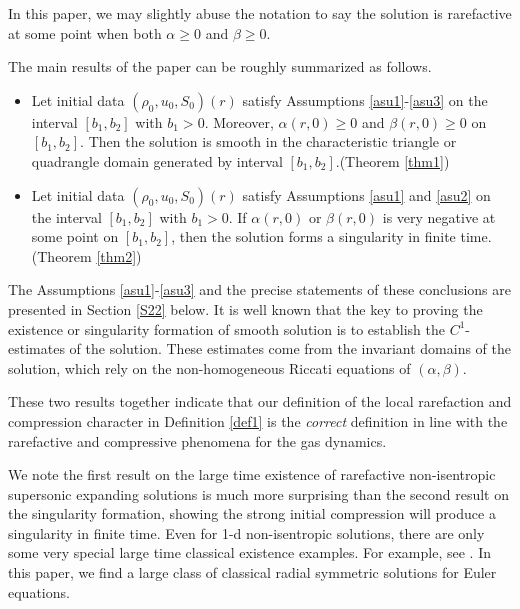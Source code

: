 \documentclass[11pt,reqno]{article}
\numberwithin{equation}{section}
\begin{document}
In this paper, we may slightly abuse the notation to say the solution is rarefactive at some point when both $\alpha\geq0$ and $\beta\geq0$.

The main results of the paper can be roughly summarized as follows.

\begin{itemize}

\item Let initial data $(\rho_0, u_0, S_0)(r)$ satisfy Assumptions \ref{asu1}-\ref{asu3} on the interval $[b_1,b_2]$ with $b_1>0$. Moreover, $\alpha(r,0)\geq0$ and $\beta(r,0)\geq0$ on $[b_1,b_2]$. Then the solution is smooth in the characteristic triangle or quadrangle domain generated by interval $[b_1,b_2]$.(Theorem \ref{thm1})

\item Let initial data $(\rho_0, u_0, S_0)(r)$ satisfy Assumptions \ref{asu1} and \ref{asu2} on the interval $[b_1,b_2]$ with $b_1>0$. If $\alpha(r,0)$ or $\beta(r,0)$ is very negative at some point on $[b_1,b_2]$, then the solution forms a singularity in finite time.(Theorem \ref{thm2})
\end{itemize}


The Assumptions \ref{asu1}-\ref{asu3} and the precise statements of these conclusions are presented in Section \ref{S22} below. It is well known that the key to proving the existence or singularity formation of smooth solution is to establish the $C^1$-estimates of the solution. These estimates come from the invariant domains of the solution, which rely on the non-homogeneous Riccati equations of $(\alpha,\beta)$.

These two results together indicate that our definition of the local rarefaction and compression character in Definition \ref{def1} is the {\it{correct}} definition in line with the rarefactive and compressive phenomena for the gas dynamics.

We note the first result on the large time existence of rarefactive non-isentropic supersonic expanding solutions is much more surprising than the second result on the singularity formation,  showing the strong initial compression will produce a singularity in finite time.
 Even for 1-d non-isentropic solutions, there are only some very special large time classical existence examples. For example, see \cite{CCZ}. In this paper, we find a large class of classical radial symmetric solutions for Euler equations.
\end{document}
